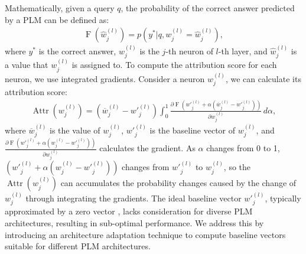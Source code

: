\documentclass[]{article}
\begin{document}
Mathematically, given a query $q$, the probability of the correct answer predicted by a PLM can be defined as:
{\small \begin{align}
\label{eq:1}
      \operatorname{F}(\hat{w}^{(l)}_{j}) = p(y^* | q, w^{(l)}_{j}=\hat{w}^ {(l)}_{j}),
\end{align}}where $y^*$ is the correct answer, ${w}^{(l)}_{j}$ is the $j$-th neuron of $l$-th layer, and $\hat{w}^ {(l)}_{j}$ is a value that ${w}^ {(l)}_{j}$ is assigned to. To compute the attribution score for each neuron, we use integrated gradients\cite{ig}. Consider a neuron ${w}^ {(l)}_{j}$, we can calculate its attribution score:
{\small
\begin{align}
    \label{eqution:attribute}
     \operatorname{Attr}({w}^{(l)}_{j}) = (\overline{w}^{(l)}_{j} - {w'}^{(l)}_{j}) \int_{0}^{1} \frac{\partial \operatorname{F}({w'}^{(l)}_{j} + \alpha(\overline{w}^{(l)}_{j} - {w'}^{(l)}_{j}))}{\partial {w}^{(l)}_{j}}  \, d\alpha,
\end{align}}where $\overline{w}^{(l)}_{j}$ is the value of ${w}^{(l)}_{j}$, ${w'}^{(l)}_{j}$ is the baseline vector of ${w}^{(l)}_{j}$, and $\frac{\partial \operatorname{F}({w'}^{(l)}_{j} + \alpha({w}^{(l)}_{j} - {w'}^{(l)}_{j}))}{\partial {w}^{(l)}_{j}}$ calculates the gradient. As $\alpha$ changes from 0 to 1, $({w'}^{(l)}_{j} + \alpha({w}^{(l)}_{j} - {w'}^{(l)}_{j}))$ changes from ${w'}^{(l)}_{j}$ to ${w}^{(l)}_{j}$, so the $\operatorname{Attr}({w}^{(l)}_{j})$ can accumulates the probability changes caused by the change of ${w}^{(l)}_{j}$ through integrating the gradients.
The ideal baseline vector ${w'}^{(l)}_{j}$, typically approximated by a zero vector \cite{transparent}, lacks consideration for diverse PLM architectures, resulting in sub-optimal performance. We address this by introducing an architecture adaptation technique to compute baseline vectors suitable for different PLM architectures.
\end{document}
